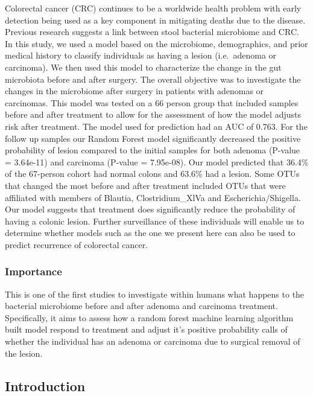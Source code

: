 \documentclass[12pt,]{article}
\begin{document}
Colorectal cancer (CRC) continues to be a worldwide health problem with
early detection being used as a key component in mitigating deaths due
to the disease. Previous research suggests a link between stool
bacterial microbiome and CRC. In this study, we used a model based on
the microbiome, demographics, and prior medical history to classify
individuals as having a lesion (i.e.~adenoma or carcinoma). We then used
this model to characterize the change in the gut microbiota before and
after surgery. The overall objective was to investigate the changes in
the microbiome after surgery in patients with adenomas or carcinomas.
This model was tested on a 66 person group that included samples before
and after treatment to allow for the assessment of how the model adjusts
risk after treatment. The model used for prediction had an AUC of 0.763.
For the follow up samples our Random Forest model significantly
decreased the positive probability of lesion compared to the initial
samples for both adenoma (P-value = 3.64e-11) and carcinoma (P-value =
7.95e-08). Our model predicted that 36.4\% of the 67-person cohort had
normal colons and 63.6\% had a lesion. Some OTUs that changed the most
before and after treatment included OTUs that were affiliated with
members of Blautia, Clostridium\_XlVa and Escherichia/Shigella. Our
model suggests that treatment does significantly reduce the probability
of having a colonic lesion. Further surveillance of these individuals
will enable us to determine whether models such as the one we present
here can also be used to predict recurrence of colorectal cancer.

\newpage

\subsubsection{Importance}\label{importance}

This is one of the first studies to investigate within humans what
happens to the bacterial microbiome before and after adenoma and
carcinoma treatment. Specifically, it aims to assess how a random forest
machine learning algorithm built model respond to treatment and adjust
it's positive probability calls of whether the individual has an adenoma
or carcinoma due to surgical removal of the lesion.

\newpage

\subsection{Introduction}\label{introduction}
\end{document}
